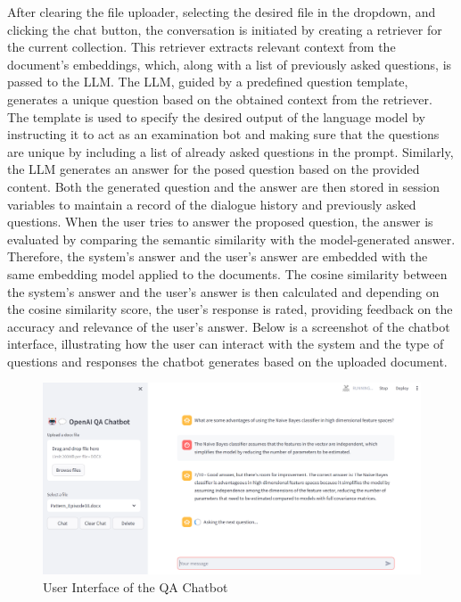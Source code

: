 \documentclass{article}
\begin{document}
\newline
After clearing the file uploader, selecting the desired file in the dropdown, and clicking the chat button, the conversation is initiated by creating a retriever for the current collection. This retriever extracts relevant context from the document's embeddings, which, along with a list of previously asked questions, is passed to the LLM. The LLM, guided by a predefined question template, generates a unique question based on the obtained context from the retriever. The template is used to specify the desired output of the language model by instructing it to act as an examination bot and making sure that the questions are unique by including a list of already asked questions in the prompt. Similarly, the LLM generates an answer for the posed question based on the provided content.
\newline
Both the generated question and the answer are then stored in session variables to maintain a record of the dialogue history and previously asked questions. When the user tries to answer the proposed question, the answer is evaluated by comparing the semantic similarity with the model-generated answer. Therefore, the system's answer and the user's answer are embedded with the same embedding model applied to the documents. The cosine similarity between the system's answer and the user's answer is then calculated and depending on the cosine similarity score, the user's response is rated, providing feedback on the accuracy and relevance of the user's answer.
\newline
Below is a screenshot of the chatbot interface, illustrating how the user can interact with the system and the type of questions and responses the chatbot generates based on the uploaded document.
\begin{figure}[h]
    \centering
    \includegraphics[width=\textwidth]{Images/chatbot_interface.png}
    \caption{User Interface of the QA Chatbot}
\end{figure}
\end{document}
